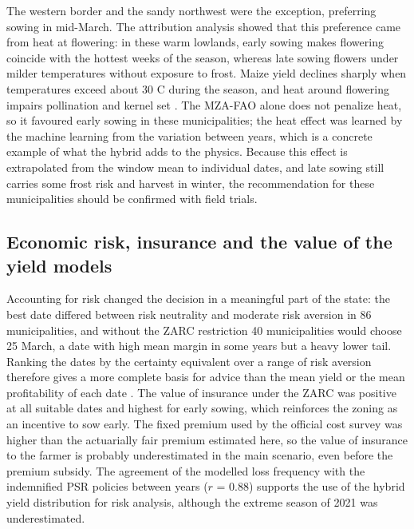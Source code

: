 \documentclass[10pt,a4paper]{article}
\begin{document}
The western border and the sandy northwest were the exception, preferring sowing in mid-March. The
attribution analysis showed that this preference came from heat at flowering: in these warm lowlands, early
sowing makes flowering coincide with the hottest weeks of the season, whereas late sowing flowers under
milder temperatures without exposure to frost. Maize yield declines sharply when temperatures exceed about
30 \textdegree{}C during the season, and heat around flowering impairs pollination and kernel set
\citep{schlenker2009, lobell2011}. The MZA-FAO alone does not penalize heat, so it favoured early sowing in
these municipalities; the heat effect was learned by the machine learning from the variation between years,
which is a concrete example of what the hybrid adds to the physics. Because this effect is extrapolated from
the window mean to individual dates, and late sowing still carries some frost risk and harvest in winter, the
recommendation for these municipalities should be confirmed with field trials.

\subsection{Economic risk, insurance and the value of the yield models}
\label{subsec:dis_economics}

Accounting for risk changed the decision in a meaningful part of the state: the best date differed between
risk neutrality and moderate risk aversion in 86 municipalities, and without the ZARC restriction 40
municipalities would choose 25 March, a date with high mean margin in some years but a heavy lower tail.
Ranking the dates by the certainty equivalent over a range of risk aversion therefore gives a more complete
basis for advice than the mean yield or the mean profitability of each date \citep{hardaker2004, oligini2021}.
The value of insurance under the ZARC was positive at all suitable dates and highest for early sowing,
which reinforces the zoning as an incentive to sow early. The fixed premium used by the official cost survey
was higher than the actuarially fair premium estimated here, so the value of insurance to the farmer is
probably underestimated in the main scenario, even before the premium subsidy. The agreement of the modelled
loss frequency with the indemnified PSR policies between years ($r$ = 0.88) supports the use of the hybrid
yield distribution for risk analysis, although the extreme season of 2021 was underestimated.
\end{document}
